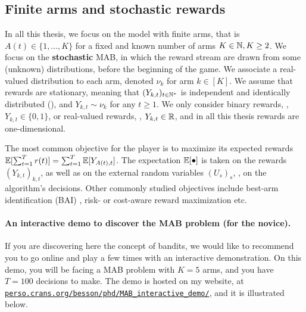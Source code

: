 \subsection{Finite arms and stochastic rewards}

In all this thesis, we focus on the model with finite arms, that is $A(t)\in\{1,\dots,K\}$ for a fixed and known number of arms $K\in\mathbb{N},K\geq2$.
%
We focus on the \textbf{stochastic} MAB, in which the reward stream are drawn from some (unknown) distributions, before the beginning of the game.
%
%
We associate a real-valued distribution to each arm, denoted $\nu_k$ for arm $k\in[K]$.
We assume that rewards are stationary, meaning that $(Y_{k,t})_{t\in\mathbb{N}^*}$ is independent and identically distributed (\iid), and $Y_{k,t} \sim \nu_k$ for any $t\geq1$.
We only consider binary rewards, \ie, $Y_{k,t}\in\{0,1\}$, or real-valued rewards, \ie, $Y_{k,t}\in\mathbb{R}$, and in all this thesis rewards are one-dimensional.

The most common objective for the player is to maximize its expected rewards $\mathbb{E}[\sum_{t=1}^T r(t)] = \sum_{t=1}^T \mathbb{E}[Y_{A(t),t}]$.
The expectation $\mathbb{E}[\bullet]$ is taken on the rewards $(Y_{k,t})_{k,t}$, as well as on the external random variables $(U_s)_s$, \ie, on the algorithm's decisions.
%
Other commonly studied objectives include best-arm identification (BAI) \cite{audibert2010best}, risk- or cost-aware reward maximization etc.


\paragraph{An interactive demo to discover the MAB problem (for the novice).}
\label{par:2:interactiveDemoDiscoverMAB}
%
If you are discovering here the concept of bandits, we would like to recommend you to go online and play a few times with an interactive demonstration.
On this demo, you will be facing a MAB problem with $K=5$ arms, and you have $T=100$ decisions to make.
The demo is hosted on my website, at \href{https://perso.crans.org/besson/phd/MAB\_interactive\_demo/}{\texttt{perso.crans.org/besson/phd/MAB\_interactive\_demo/}}, and it is illustrated below.


